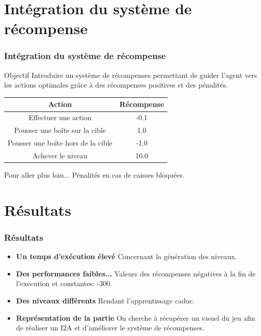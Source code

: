 \documentclass[
	11pt, %
]{beamer}
\begin{document}
\section{Intégration du système de récompense}

\begin{frame}
	\frametitle{Intégration du système de récompense}

	\begin{block}{Objectif}
		Introduire un système de récompenses permettant de guider l'agent vers les actions optimales grâce à des récompenses positives et des pénalités.
	\end{block}

	\smallskip %

	\begin{center}
        \begin{tabular}{|c|c|}
            \hline
            \textbf{Action} & \textbf{Récompense} \\
            \hline
            Effectuer une action & -0.1 \\
            Pousser une boîte sur la cible & 1.0 \\
            Pousser une boîte hors de la cible & -1.0 \\
            Achever le niveau & 10.0 \\
            \hline
        \end{tabular}
    \end{center}

	\begin{block}{Pour aller plus loin...}
		Pénalités en cas de caisses bloquées.
	\end{block}
\end{frame}


\section{Résultats}

\begin{frame}
	\frametitle{Résultats}

	\begin{itemize}
        \item \textbf{Un temps d'exécution élevé} Concernant la génération des niveaux.
        \item \textbf{Des performances faibles...} Valeurs des récompenses négatives à la fin de l'execution et constantes: -300.
        \item \textbf{Des niveaux différents} Rendant l'apprentissage caduc.
        \item \textbf{Représentation de la partie} On cherche à récupérer un visuel du jeu afin de réaliser un I2A et d'améliorer le système de récompenses.
    \end{itemize}
\end{frame}
\end{document}
